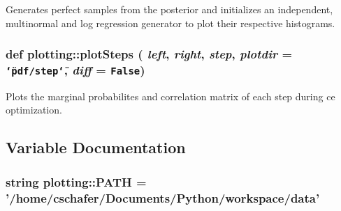 Generates perfect samples from the posterior and initializes an independent, multinormal and log regression generator to plot their respective histograms. 

\hypertarget{namespaceplotting_b505da9b5173fdd94b5900e8a9017160}{
\subsubsection[{plotSteps}]{\setlength{\rightskip}{0pt plus 5cm}def plotting::plotSteps ( {\em left}, \/   {\em right}, \/   {\em step}, \/   {\em plotdir} = {\tt \char`\"{}pdf/step\char`\"{}}, \/   {\em diff} = {\tt False})}}
\label{namespaceplotting_b505da9b5173fdd94b5900e8a9017160}


Plots the marginal probabilites and correlation matrix of each step during ce optimization. 



\subsection{Variable Documentation}
\hypertarget{namespaceplotting_9422d71ff1b0ed3d54e826072cbc5df6}{
\subsubsection[{PATH}]{\setlength{\rightskip}{0pt plus 5cm}string {\bf plotting::PATH} = '/home/cschafer/Documents/Python/workspace/{\bf data}'}}
\label{namespaceplotting_9422d71ff1b0ed3d54e826072cbc5df6}


